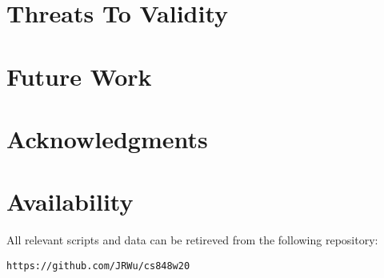 \documentclass[letterpaper,twocolumn,10pt]{article}
\begin{document}
\section{Threats To Validity}


\section{Future Work}


\section{Acknowledgments}


\section{Availability}\label{Availability}
All relevant scripts and data can be retireved from the following repository:
\begin{center}
{\tt https://github.com/JRWu/cs848w20}
\end{center}

{\footnotesize 

\theendnotes

\newpage
}
\end{document}
